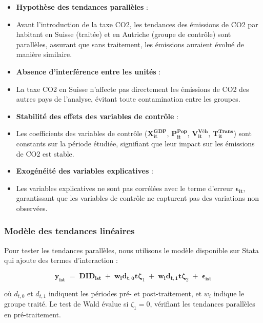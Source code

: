 \begin{itemize}
    \item[] \textbf{Hypothèse des tendances parallèles} : 
    \item[] Avant l'introduction de la taxe CO2, les tendances des émissions de CO2 par habitant en Suisse (traitée) et en Autriche (groupe de contrôle) sont parallèles, assurant que sans traitement, les émissions auraient évolué de manière similaire.
    
    \item[] \textbf{Absence d'interférence entre les unités} : 
    \item[] La taxe CO2 en Suisse n'affecte pas directement les émissions de CO2 des autres pays de l'analyse, évitant toute contamination entre les groupes.
    
    \item[] \textbf{Stabilité des effets des variables de contrôle} : 
    \item[] Les coefficients des variables de contrôle ($\mathbf{X_{it}^{GDP}}$, $\mathbf{P_{it}^{Pop}}$, $\mathbf{V_{it}^{Véh}}$, $\mathbf{T_{it}^{Trans}}$) sont constants sur la période étudiée, signifiant que leur impact sur les émissions de CO2 est stable.
    
    \item[] \textbf{Exogénéité des variables explicatives} : 
    \item[] Les variables explicatives ne sont pas corrélées avec le terme d'erreur $\mathbf{\epsilon_{it}}$, garantissant que les variables de contrôle ne capturent pas des variations non observées.
\end{itemize}

\subsubsection{Modèle des tendances linéaires}
\label{subsubsec:strategie_linear_trend_method}

Pour tester les tendances parallèles, nous utilisons le modèle disponible sur Stata \supercite{stata_didregress} qui ajoute des termes d'interaction :

$$
\mathbf{y_{ist}} \; = \;  \mathbf{DID_{ist}} \;  +\;   \mathbf{w_i} \mathbf{d_{t,0}} \mathbf{t} \boldsymbol{\zeta}_1 \;  + \;  \mathbf{w_i} \mathbf{d_{t,1}} \mathbf{t} \boldsymbol{\zeta}_2 \;  +\;  \boldsymbol{\epsilon_{ist}}
$$

où $d_{t,0}$ et $d_{t,1}$ indiquent les périodes pré- et post-traitement, et $w_i$ indique le groupe traité. Le test de Wald évalue si $\zeta_1 = 0$, vérifiant les tendances parallèles en pré-traitement.


